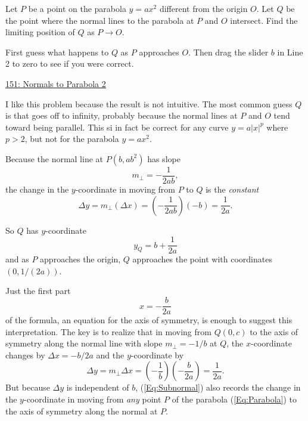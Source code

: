 \documentclass{ximera}
\begin{document}
\begin{exercise}
Let $P$ be a point on the parabola $y=ax^2$ different from the origin $O$. Let $Q$ be the point where the normal lines to the parabola at $P$ and $O$ intersect. Find the limiting position of $Q$ as $P\to O$.

\begin{exploration}
First guess what happens to $Q$ as $P$ approaches $O$. Then drag the slider $b$ in Line 2 to zero to see if you were correct.
\begin{onlineOnly}
    \begin{center}
\end{center}
\end{onlineOnly}

\href{https://www.desmos.com/calculator/4noszgo6dj}{151: Normals to Parabola 2}
\end{exploration}

\begin{explanation}
I like this problem because the result is not intuitive. The most common guess $Q$ is that goes off to infinity, probably because the normal lines at $P$ and $O$ tend toward being parallel. This si in fact be correct for any curve $y=a|x|^p$ where $p>2$, but not for the parabola $y=ax^2$.

Because the normal line at $P(b,ab^2)$ has slope
\[
        m_\perp = -\frac{1}{2ab} ,
\] 
the change in the $y$-coordinate in moving from $P$ to $Q$ is the \emph{constant}
\[
 \Delta y =  m_\perp (\Delta x) =  \left( -\frac{1}{2ab}\right)(-b)  = \frac{1}{2a} .
\]

So $Q$ has $y$-coordinate
\[
     y_Q = b + \frac{1}{2a}
\]
and as $P$ approaches the origin, $Q$ approaches the point with coordinates $(0,1/(2a))$.
\end{explanation}


\end{exercise}

Just the first part 
\[
    x = -\frac{b}{2a}
\]
of the formula, an equation for the axis of symmetry, is enough to suggest this interpretation. The key is to realize that in moving from $Q(0,c)$ to the axis of symmetry along the normal line with slope $m_\perp = -1/b$ at $Q$, the $x$-coordinate changes by $\Delta x = -b/2a$ and the $y$-coordinate by
\begin{equation}
 \Delta y = m_\perp \Delta x = \left( -\frac{1}{b}\right) \left(- \frac{b}{2a}  \right)= \frac{1}{2a} .  \label{Eq:Subnormal}
\end{equation}
But because $\Delta y$ is independent of $b$, (\ref{Eq:Subnormal}) also records the change in the $y$-coordinate in moving from \emph{any} point $P$ of the parabola (\ref{Eq:Parabola}) to the axis of symmetry along the normal at $P$.
\end{document}
